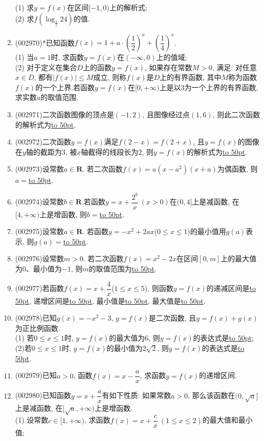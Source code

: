 \documentclass[10pt,a4paper]{article}
\newcommand{\blank}[1]{\underline{\hbox to #1pt{}}}
\begin{document}
\begin{enumerate}[1.]
(1) 求$y=f(x)$在区间$[-1,0)$上的解析式;\\
(2) 求$f(\log_{\frac 12}24)$的值.
\item {\tiny (002970)}*已知函数$f(x)=1+a\cdot (\dfrac 12)^x+(\dfrac 14)^x$.\\
(1) 当$a=1$时, 求函数$y=f(x)$在$(-\infty,0)$上的值域;\\
(2) 对于定义在集合$D$上的函数$y=f(x)$, 如果存在常数$M>0$, 满足: 对任意$x\in D$, 都有$|f(x)|\le M$成立, 则称$f(x)$是$D$上的有界函数, 其中$M$称为函数$f(x)$的一个上界.若函数$y=f(x)$在$[0,+\infty)$上是以$3$为一个上界的有界函数, 求实数$a$的取值范围.
\item {\tiny (002971)}二次函数图像的顶点是$(-1,2)$, 且图像经过点$(1,6)$, 则此二次函数的解析式为\blank{50}.
\item {\tiny (002972)}二次函数$y=f(x)$满足$f(2-x)=f(2+x)$, 且$y=f(x)$的图像在$y$轴的截距为$3$, 被$x$轴截得的线段长为$2$, 则$y=f(x)$的解析式为\blank{50}.
\item {\tiny (002973)}设常数$a\in \mathbf{R}$. 若二次函数$f(x)=a(x-a^2)(x+a)$为偶函数, 则$a=$\blank{50}.
\item {\tiny (002974)}设常数$b\in \mathbf{R}$.若函数$y=x+\dfrac{2^b}x \ (x>0)$在$(0,4]$上是减函数, 在$[4,+\infty)$上是增函数, 则$b=$\blank{50}.
\item {\tiny (002975)}设常数$a\in \mathbf{R}$. 若函数$y=-x^2+2ax$($0\le x\le 1$)的最小值用$g(a)$表示, 则$g(a)=$\blank{50}.
\item {\tiny (002976)}设常数$m>0$. 若二次函数$f(x)=x^2-2x$在区间$[0,m]$上的最大值为$0$、最小值为$-1$, 则$m$的取值范围为\blank{50}.
\item {\tiny (002977)}若函数$f(x)=x+\dfrac 4x$($1\le x\le 5$), 则函数$y=f(x)$的递减区间是\blank{50}, 递增区间是\blank{50}, 最小值是\blank{50}, 最大值是\blank{50}.
\item {\tiny (002978)}已知$g(x)=-x^2-3$, $y=f(x)$是二次函数, 且$y=f(x)+g(x)$为正比例函数.\\
(1) 若$0\le x\le 1$时, $y=f(x)$的最大值为6, 则$y=f(x)$的表达式是\blank{50};\\
(2)若$0\le x\le 1$时, $y=f(x)$的最小值为$2\sqrt 2$, 则$y=f(x)$的表达式是\blank{50}.
\item {\tiny (002979)}已知$a>0$, 函数$f(x)=x-\dfrac ax$, 求函数$y=f(x)$的递增区间.
\item {\tiny (002980)}已知函数$y=x+\dfrac ax$有如下性质: 如果常数$a>0$, 那么该函数在$(0, \sqrt a]$上是减函数, 在$[\sqrt a, +\infty)$上是增函数.\\
(1) 设常数$c\in [1,+\infty)$, 求函数$f(x)=x+\dfrac cx \ (1\le x\le 2)$的最大值和最小值;\\

\end{enumerate}
\end{document}
